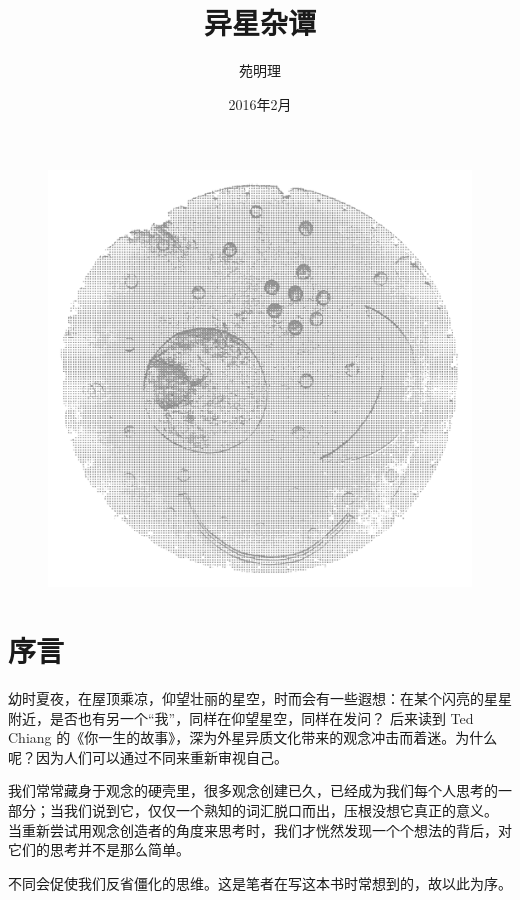 \documentclass[a4paper,10.5pt]{article}
\title{异星杂谭}
\author{苑明理}
\date{2016年2月}
\begin{document}
\maketitle{}


\begin{figure}[ht]
\centering
\includegraphics[width=4.5in]{images/0_00-Cover.png}
\end{figure}


\newpage
\renewcommand\contentsname{目录}
\setcounter{tocdepth}{2}
\tableofcontents

\newpage

\section{序言}

幼时夏夜，在屋顶乘凉，仰望壮丽的星空，时而会有一些遐想：在某个闪亮的星星附近，是否也有另一个“我”，同样在仰望星空，同样在发问？
后来读到 Ted Chiang 的《你一生的故事》，深为外星异质文化带来的观念冲击而着迷。为什么呢？因为人们可以通过不同来重新审视自己。

我们常常藏身于观念的硬壳里，很多观念创建已久，已经成为我们每个人思考的一部分；当我们说到它，仅仅一个熟知的词汇脱口而出，压根没想它真正的意义。
当重新尝试用观念创造者的角度来思考时，我们才恍然发现一个个想法的背后，对它们的思考并不是那么简单。

不同会促使我们反省僵化的思维。这是笔者在写这本书时常想到的，故以此为序。

\newpage
\end{document}
